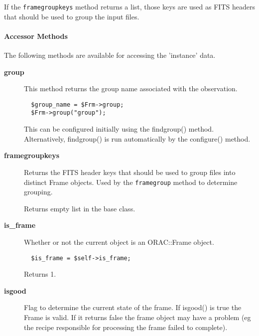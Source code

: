 \begin{description}
If the \texttt{framegroupkeys} method returns a list, those keys
are used as FITS headers that should be used to group the input
files.

\paragraph*{Accessor Methods\label{ORAC::Frame_Accessor_Methods}}


The following methods are available for accessing the 
'instance' data.

\begin{description}

\item[{\textbf{group}}] \mbox{}

This method returns the group name associated with the observation.

\begin{verbatim}
  $group_name = $Frm->group;
  $Frm->group("group");
\end{verbatim}


This can be configured initially using the findgroup() method.
Alternatively, findgroup() is run automatically by the configure()
method.


\item[{\textbf{framegroupkeys}}] \mbox{}

Returns the FITS header keys that should be used to group
files into distinct Frame objects. Used by the \texttt{framegroup}
method to determine grouping.



Returns empty list in the base class.


\item[{\textbf{is\_frame}}] \mbox{}

Whether or not the current object is an ORAC::Frame object.

\begin{verbatim}
  $is_frame = $self->is_frame;
\end{verbatim}


Returns 1.


\item[{\textbf{isgood}}] \mbox{}

Flag to determine the current state of the frame. If isgood() is true
the Frame is valid. If it returns false the frame object may have a
problem (eg the recipe responsible for processing the frame failed to
complete).




\end{description}
\end{description}
